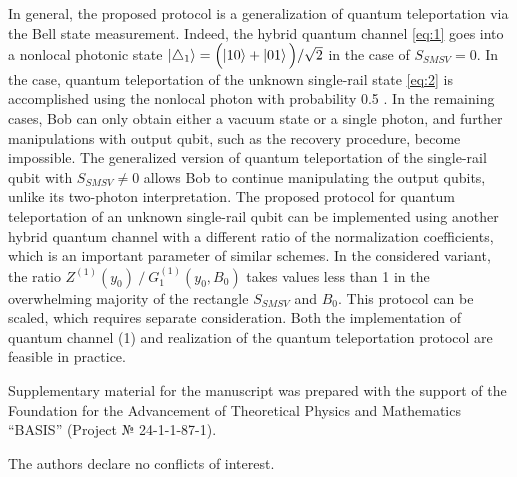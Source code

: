 \documentclass{optica-article}
\begin{document}
\par In general, the proposed protocol is a generalization of quantum teleportation via the Bell state measurement. Indeed, the hybrid quantum channel \eqref{eq:1}  goes into a nonlocal photonic state  $\ket{\triangle_{1}} =\Bigl(\ket{10} + \ket{01}\Bigl)/\sqrt{2}$ in the case of $S_{SMSV}=0$. 
In the case, quantum teleportation of the unknown single-rail state \eqref{eq:2}  is accomplished using the nonlocal photon with probability 0.5 \cite{15,16}. In the remaining cases, Bob can only obtain either a vacuum state or a single photon, and further manipulations with output qubit, such as the recovery procedure, become impossible. The generalized version of quantum teleportation of the single-rail qubit with $S_{SMSV}\neq 0$ allows Bob to continue manipulating the output qubits, unlike its two-photon interpretation. The proposed protocol for quantum teleportation of an unknown single-rail qubit can be implemented using another hybrid quantum channel with a different ratio of the normalization coefficients, which is an important parameter of similar schemes. In the considered variant, the ratio $Z^{(1)}(y_0 )⁄G_1^{(1)}(y_0,B_0 )$ takes values less than 1 in the overwhelming majority of the rectangle $S_{SMSV}$ and $B_0$. This protocol can be scaled, which requires separate consideration. Both the implementation of quantum channel (1) and realization of the quantum teleportation protocol are feasible in practice. 


\begin{backmatter}
     \!\!\!\!\!\!Supplementary material for the manuscript was prepared with the support of the Foundation for the Advancement of Theoretical Physics and Mathematics “BASIS” (Project № 24-1-1-87-1). 
    
    \!\!\!The authors declare no conflicts of interest.
    
\end{backmatter}
\end{document}
